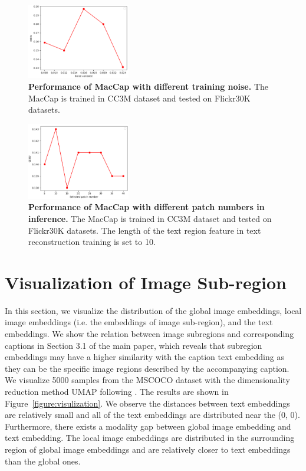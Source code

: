 \begin{figure}[htb]
  \centering
  \includegraphics[width=0.4\textwidth]{AnonymousSubmission/LaTeX/asserts/supply_noise.png}
   \caption{\textbf{Performance of MacCap with different training noise.} The MacCap is trained in CC3M dataset and tested on Flickr30K datasets.}
    \label{figure:noise}
    \vspace{-0.2cm}
\end{figure}

\begin{figure}[bt]
  \centering
  \includegraphics[width=0.4\textwidth]{AnonymousSubmission/LaTeX/asserts/seq_supply.png}
   \caption{\textbf{Performance of MacCap with different patch numbers in inference.} The MacCap is trained in CC3M dataset and tested on Flickr30K datasets. The length of the text region feature in text reconstruction training is set to 10.}
    \label{figure:seq}
    \vspace{-0.2cm}
\end{figure}


\section{Visualization of Image Sub-region}
In this section, we visualize the distribution of the global image embeddings, local image embeddings (i.e. the embeddings of image sub-region), and the text embeddings. We show the relation between image subregions and corresponding captions in Section 3.1 of the main paper, which reveals that subregion embeddings may have a higher similarity with the caption text embedding as they can be the specific image regions described by the accompanying caption. We visualize 5000 samples from the MSCOCO dataset with the dimensionality reduction method UMAP following \cite{MindGap}. The results are shown in Figure~\ref{figure:visulization}. We observe the distances between text embeddings are relatively small and all of the text embeddings are distributed near the (0, 0). Furthermore, there exists a modality gap between global image embedding and text embedding. The local image embeddings are distributed in the surrounding region of global image embeddings and are relatively closer to text embeddings than the global ones.

